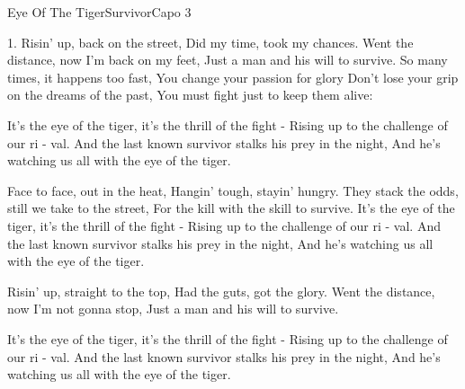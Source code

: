 \begin{song}{Eye Of The Tiger}{Survivor}{Capo 3}


1. Risin' up, back on the street,
  Did my time, took my chances.
  Went the distance, now I'm back on my feet,
Just a man and his will to survive.
  So many times, it happens too fast,
  You change your passion for glory
  Don't lose your grip on the dreams of the past,
You must fight just to keep them alive:

It's the    eye of the tiger, it's the thrill of the fight -
Rising up to the challenge of our ri - val.
And the last known survivor stalks his prey in the night,
And he's watching us all with the eye of the tiger.

Face to face, out in the heat,
Hangin' tough, stayin' hungry.
They stack the odds, still we take to the street,
For the kill with the skill to survive.
\newpage
{}
It's the    eye of the tiger, it's the thrill of the fight -
Rising up to the challenge of our ri - val.
And the last known survivor stalks his prey in the night,
And he's watching us all with the eye of the tiger.

Risin' up, straight to the top,
Had the guts, got the glory.
Went the distance, now I'm not gonna stop,
Just a man and his will to survive.

It's the    eye of the tiger, it's the thrill of the fight -
Rising up to the challenge of our ri - val.
And the last known survivor stalks his prey in the night,
And he's watching us all with the eye of the tiger.

\end{song}
